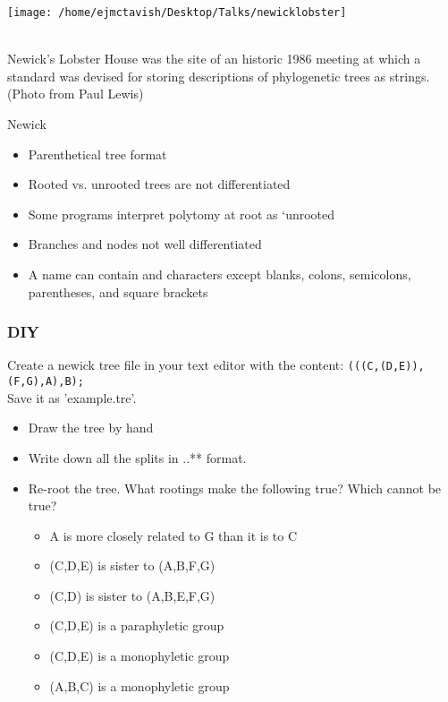 \documentclass{beamer}
\begin{document}

\begin{frame}
\end{frame}


\begin{frame}
\begin{centering}
\texttt{[image: /home/ejmctavish/Desktop/Talks/newicklobster]}
\end{centering}\\
 Newick’s Lobster House was the site of an historic 1986 meeting 
 at which a standard was devised for storing descriptions of 
 phylogenetic trees as strings. 
 (Photo from Paul Lewis)
\end{frame}






\begin{frame}
Newick\\
\begin{itemize}
 \item Parenthetical tree format
 \item Rooted vs. unrooted trees are not differentiated
 \item Some programs interpret polytomy at root as `unrooted
 \item Branches and nodes not well differentiated
 \item A name can contain and characters except blanks, colons, semicolons, parentheses, and square brackets
\end{itemize}
\end{frame}


\begin{frame}
\frametitle{DIY}
Create a newick tree file in your text editor with the content:
\texttt{(((C,(D,E)),(F,G),A),B);}\\
Save it as 'example.tre'.\\
\begin{itemize}
 \item Draw the tree by hand
 \item Write down all the splits in ..** format.
 \item Re-root  the tree. What rootings make the following true? Which cannot be true?
 \begin{itemize}
 \item A is more closely related to G than it is to C
 \item (C,D,E) is sister to (A,B,F,G)
 \item (C,D) is sister to (A,B,E,F,G)
 \item (C,D,E) is a paraphyletic group
 \item (C,D,E) is a monophyletic group
 \item (A,B,C) is a monophyletic group
 \end{itemize}
\end{itemize}
\end{frame}
\end{document}
